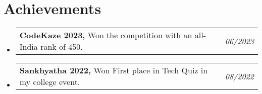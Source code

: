 \documentclass[a4paper,11pt]{article}
\makeatletter
\newcommand{\resumePOR}[3]{
\vspace{0.5mm}\item
    \begin{tabular*}{0.97\textwidth}[t]{l@{\extracolsep{\fill}}r}
        \textbf{#1}\hspace{0.3mm}#2 & \textit{\small{#3}} 
    \end{tabular*}
    \vspace{-2mm}
}
\newcommand{\resumeSubHeadingListStart}{\begin{itemize}[leftmargin=*,labelsep=0mm]}
\newcommand{\resumeSubHeadingListEnd}{\end{itemize}\vspace{2mm}}
\makeatother
\begin{document}
\section{\textbf{Achievements}}
\vspace{-0.4mm}
\resumeSubHeadingListStart
\resumePOR{CodeKaze 2023, } %
    {Won the competition with an all-India rank of 450.} %
    {06/2023} %
    
\resumePOR{Sankhyatha 2022, } %
    {Won First place in Tech Quiz in my college event.} %
    {08/2022} %
\resumeSubHeadingListEnd
\vspace{-5mm}


\end{document}
